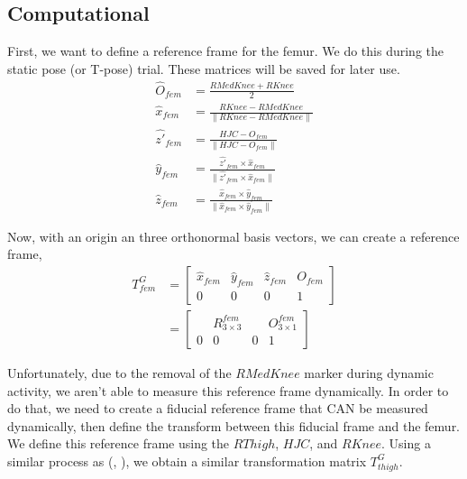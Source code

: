 \documentclass[10pt]{IEEEtran}
\begin{document}
    \subsection{Computational}
    First, we want to define a reference frame for the femur. We do this during the static pose (or T-pose) trial. These matrices will be saved for later use.
\begin{equation}
    \begin{aligned}
        \hat{O}_{fem} &= \frac{RMedKnee + RKnee}{2}\\
        \hat{x}_{fem} & = \frac{RKnee - RMedKnee}{\|RKnee - RMedKnee\|} \\
        \hat{z'}_{fem} &= \frac{HJC - O_{fem}}{\|HJC - O_{fem}\|} \\
        \hat{y}_{fem} &= \frac{\hat{z'}_{fem} \times \hat{x}_{fem}}{\|\hat{z'}_{fem} \times \hat{x}_{fem}\|} \\
        \hat{z}_{fem} & = \frac{\hat{x}_{fem} \times \hat{y}_{fem}}{\|\hat{x}_{fem} \times \hat{y}_{fem}\|}
    \end{aligned}
    \label{fem_rf}
\end{equation}
    
    Now, with an origin an three orthonormal basis vectors, we can create a reference frame,
    \begin{equation}
        \begin{aligned}
            T^{G}_{fem} &= \begin{bmatrix}
                \hat{x}_{fem} &\hat{y}_{fem} &\hat{z}_{fem} & O_{fem} \\
                0 & 0 & 0 & 1
            \end{bmatrix} \\
            &= \begin{bmatrix}
                & R^{fem}_{3 \times 3} & & O^{fem}_{3 \times 1} \\
                0 & 0 & 0 & 1
            \end{bmatrix}
        \end{aligned}
        \label{t_gf}
    \end{equation}

    Unfortunately, due to the removal of the $RMedKnee$ marker during dynamic activity, we aren't able to measure this reference frame dynamically. In order to do that, we need to create a fiducial reference frame that CAN be measured dynamically, then define the transform between this fiducial frame and the femur. We define this reference frame using the $RThigh$, $HJC$, and $RKnee$.
    Using a similar process as (, ), we obtain a similar transformation matrix $T^{G}_{thigh}$. 
\end{document}
